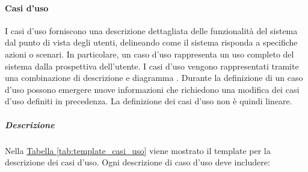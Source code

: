\paragraph{Casi d'uso}
\label{par:casi_uso}
I casi d'uso forniscono una descrizione dettagliata delle funzionalità del sistema dal punto di vista degli utenti, delineando come il sistema risponda a specifiche azioni o scenari. 
In particolare, un caso d'uso rappresenta un uso completo del sistema dalla prospettiva dell'utente.
I casi d'uso vengono rappresentati tramite una combinazione di descrizione e diagramma .
Durante la definizione di un caso d'uso possono emergere nuove informazioni che richiedono una modifica dei casi d'uso definiti in precedenza.
La definizione dei casi d'uso non è quindi lineare.

\subparagraph{Descrizione}
Nella \hyperref[tab:template_casi_uso]{Tabella \ref{tab:template_casi_uso}} viene mostrato il template per la descrizione dei casi d'uso.
Ogni descrizione di caso d'uso deve includere:
